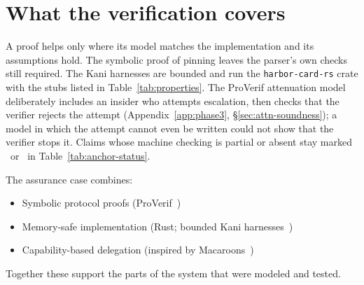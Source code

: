 \documentclass[11pt,a4paper]{article}
\theoremstyle{definition}
\begin{document}
\section{What the verification covers}\label{sec:conclusion}

A proof helps only where its model matches the implementation and its assumptions hold. The symbolic proof of pinning leaves the parser's own checks still required. The Kani harnesses are bounded and run the \texttt{harbor-card-rs} crate with the stubs listed in Table~\ref{tab:properties}. The ProVerif attenuation model deliberately includes an insider who attempts escalation, then checks that the verifier rejects the attempt (Appendix~\ref{app:phase3}, \S\ref{sec:attn-soundness}); a model in which the attempt cannot even be written could not show that the verifier stops it. Claims whose machine checking is partial or absent stay marked \Partial\ or \Open\ in Table~\ref{tab:anchor-status}.



The assurance case combines:

\begin{itemize}
  \item Symbolic protocol proofs (ProVerif~)
  \item Memory-safe implementation (Rust; bounded Kani harnesses~)
  \item Capability-based delegation (inspired by Macaroons~)
\end{itemize}

Together these support the parts of the system that were modeled and tested.
\end{document}
